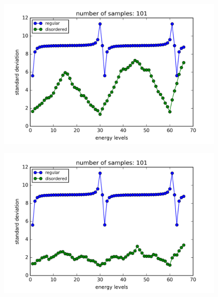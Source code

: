 \begin{figure}[!htbh]
\centering
\begin{minipage}{.45\textwidth}
  \centering
  \includegraphics[width=1.1\linewidth]{standardDeviation/N_31_100a30_0_1_1_p_0_5.png}
  \label{fig:disordered sys num 3}
\end{minipage}\qquad
\begin{minipage}{.45\textwidth}
  \centering
  \includegraphics[width=1.1\linewidth]{standardDeviation/N_31_100a30_0_1_5_p_0_5.png}
  \label{fig:disordered sys num 4}
\end{minipage}
\end{figure}

